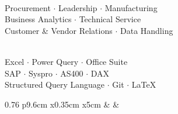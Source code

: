 \documentclass[10pt,A4]{article}
\begin{document}
\begin{minipage}[c][0.1\textheight][t]{\linewidth}

\begin{center}
	\parbox[t]{7.5cm}{
\hspace{4.3cm} \large{} \normalsize
\\ Procurement \hspace{2pt} $\cdot$ \hspace{2pt} Leadership \hspace{2pt} $\cdot$ \hspace{2pt} Manufacturing
\\ Business Analytics  \hspace{2pt} $\cdot$ \hspace{2pt} Technical Service
\\ Customer \& Vendor Relations \hspace{2pt} $\cdot$ \hspace{2pt} Data Handling
	}
\hspace{0.5cm}
	\parbox[t]{7.5cm}{
\hspace{2.5cm} \large{} \normalsize
\\ Excel  \hspace{3pt} $\cdot$ \hspace{4pt}  Power Query  \hspace{4pt} $\cdot$ \hspace{4pt}  Office Suite
\\ SAP   \hspace{4pt} $\cdot$ \hspace{4pt}  Syspro  \hspace{4pt} $\cdot$ \hspace{4pt} AS400  \hspace{4pt} $\cdot$ \hspace{4pt} DAX
\\  Structured Query Language  \hspace{4pt}  $\cdot$ \hspace{4pt}  Git   \hspace{4pt} $\cdot$ \hspace{4pt}  \LaTeX{}
	}

        
\vspace{4pt}


\begin{tabular*}{0.76\linewidth}{ p{9.6cm} x{0.35cm} x{5cm}}
\large{\hspace{4.05cm}  }& & \cr


\end{tabular*}
\end{center}
\end{minipage}
\end{document}
